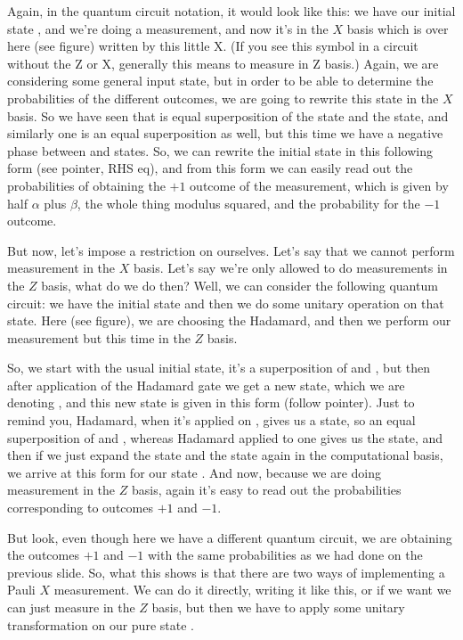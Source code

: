Again, in the quantum circuit notation, it would look like this: we have our initial state \ket{\psi}, and we're doing a measurement, and now it's in the $X$ basis which is over here (see figure) written by this little X.  (If you see this symbol in a circuit without the Z or X, generally this means to measure in Z basis.) Again, we are considering some general input state, but in order to be able to determine the probabilities of the different outcomes, we are going to rewrite this state in the $X$ basis. So we have seen that  is equal superposition of the \ket{+} state and the \ket{-} state, and similarly one is an equal superposition as well, but this time we have a negative phase between \ket{+} and \ket{-} states. So, we can rewrite the initial state in this following form (see pointer, RHS eq), and from this form we can easily read out the probabilities of obtaining the  $+1$ outcome of the measurement, which is given by half $\alpha$ plus $\beta$, the whole thing modulus squared, and the probability for the  $-1$ outcome.

But now, let's impose a restriction on ourselves. Let's say that we cannot perform measurement in the $X$ basis. Let's say we're only allowed to do measurements in the $Z$ basis, what do we do then? Well, we can consider the following quantum circuit: we have the initial state and then we do some unitary operation on that state. Here (see figure), we are choosing the Hadamard, and then we perform our measurement but this time in the $Z$ basis.


So, we start with the usual initial state, it's a superposition of  and , but then after application of the Hadamard gate we get a new state, which we are denoting , and this new state is given in this form (follow pointer). Just to remind you, Hadamard, when it's applied on , gives us a \ket{+} state, so an equal superposition of  and , whereas Hadamard applied to one gives us the \ket{-} state, and then if we just expand the \ket{+} state and the \ket{-} state again in the computational basis, we arrive at this form for our state \ket{\Psi^+}. And now, because we are doing measurement in the $Z$ basis, again it's easy to read out the probabilities corresponding to outcomes $+1$ and $-1$.

But look, even though here we have a different quantum circuit, we are obtaining the outcomes $+1$ and $-1$ with the same probabilities as we had done on the previous slide. So, what this shows is that there are two ways of implementing a Pauli $X$ measurement. We can do it directly, writing it like this, or if we want we can just measure in the $Z$ basis, but then we have to apply some unitary transformation on our pure state \ket{\psi}.

